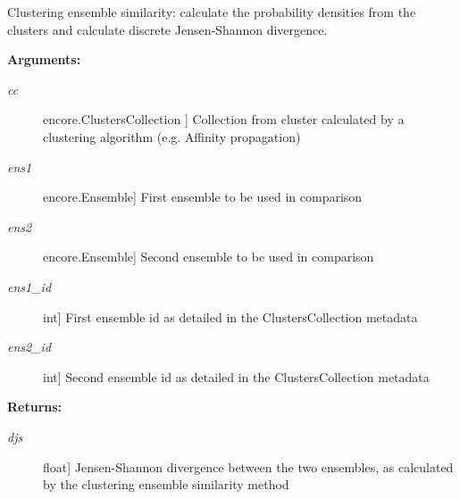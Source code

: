 \documentclass[letterpaper,10pt,english]{sphinxmanual}
\begin{document}
\begin{fulllineitems}
\label{index:encore.similarity.clustering_ensemble_similarity}
Clustering ensemble similarity: calculate the probability densities from the clusters and calculate discrete Jensen-Shannon divergence.

\textbf{Arguments:}
\begin{description}
\item[{\emph{cc}}] \leavevmode{[}encore.ClustersCollection {]}
Collection from cluster calculated by a clustering algorithm (e.g. Affinity propagation)

\item[{\emph{ens1}}] \leavevmode{[}encore.Ensemble{]}
First ensemble to be used in comparison

\item[{\emph{ens2}}] \leavevmode{[}encore.Ensemble{]}
Second ensemble to be used in comparison

\item[{\emph{ens1\_id}}] \leavevmode{[}int{]}
First ensemble id as detailed in the ClustersCollection metadata

\item[{\emph{ens2\_id}}] \leavevmode{[}int{]}
Second ensemble id as detailed in the ClustersCollection metadata

\end{description}

\textbf{Returns:}
\begin{description}
\item[{\emph{djs}}] \leavevmode{[}float{]}
Jensen-Shannon divergence between the two ensembles, as calculated by the clustering ensemble similarity method

\end{description}

\end{fulllineitems}

\end{document}
